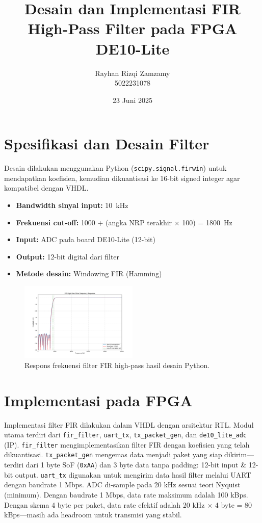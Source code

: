 \documentclass[a4paper,12pt]{article}
\title{Desain dan Implementasi FIR High-Pass Filter pada FPGA DE10-Lite}
\author{Rayhan Rizqi Zamzamy \\ 5022231078}
\date{23 Juni 2025}
\begin{document}
\maketitle

\section{Spesifikasi dan Desain Filter}

Desain dilakukan menggunakan Python (\texttt{scipy.signal.firwin}) untuk mendapatkan koefisien, 
kemudian dikuantisasi ke 16-bit signed integer agar kompatibel dengan VHDL.

\begin{itemize}
    \setlength\itemsep{0em}
    \item \textbf{Bandwidth sinyal input:} 10~kHz
    \item \textbf{Frekuensi cut-off:} 1000 + (angka NRP terakhir $\times$ 100) = 1800~Hz
    \item \textbf{Input:} ADC pada board DE10-Lite (12-bit)
    \item \textbf{Output:} 12-bit digital dari filter
    \item \textbf{Metode desain:} Windowing FIR (Hamming)
\end{itemize}

\vspace{-2em}
\begin{figure}[H]
    \centering
    \includegraphics[width=0.5\textwidth]{images/freq_response_sim.png}
    \caption{Respons frekuensi filter FIR high-pass hasil desain Python.}
\end{figure}
\vspace{-3em}

\section{Implementasi pada FPGA}

Implementasi filter FIR dilakukan dalam VHDL dengan arsitektur RTL. 
Modul utama terdiri dari \texttt{fir\_filter}, \texttt{uart\_tx}, \texttt{tx\_packet\_gen}, dan \texttt{de10\_lite\_adc} (IP). 
\texttt{fir\_filter} mengimplementasikan filter FIR dengan koefisien yang telah dikuantisasi. 
\texttt{tx\_packet\_gen} mengemas data menjadi paket yang siap dikirim---terdiri dari 1 byte SoF (\texttt{0xAA}) 
dan 3 byte data tanpa padding: 12-bit input \& 12-bit output.
\texttt{uart\_tx} digunakan untuk mengirim data hasil filter melalui UART dengan baudrate 1 Mbps.
ADC di-sample pada 20 kHz sesuai teori Nyquist (minimum). Dengan baudrate 1 Mbps, data rate maksimum adalah 100 kBps. 
Dengan skema 4 byte per paket, data rate efektif adalah 20 kHz $\times$ 4 byte = 80 kBps---masih ada headroom untuk transmisi yang stabil.
\end{document}
